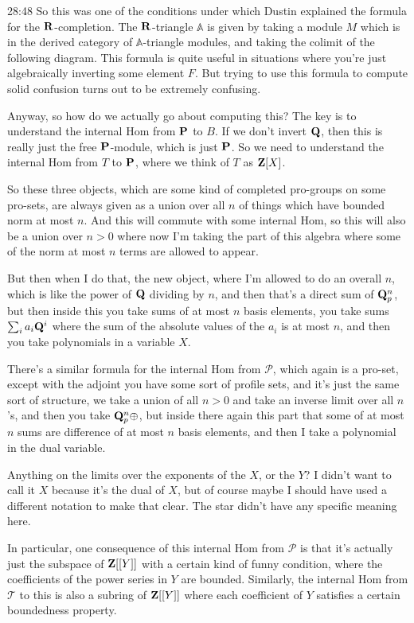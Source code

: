 \begin{unfinished}{28:48}
So this was one of the conditions under which Dustin explained the formula for the $\R$-completion. The $\R$-triangle $\mathbb{A}$ is given by taking a module $M$ which is in the derived category of $\mathbb{A}$-triangle modules, and taking the colimit of the following diagram. This formula is quite useful in situations where you're just algebraically inverting some element $F$. But trying to use this formula to compute solid confusion turns out to be extremely confusing.

Anyway, so how do we actually go about computing this? The key is to understand the internal Hom from $\P$ to $B$. If we don't invert $\Q$, then this is really just the free $\P$-module, which is just $\P$. So we need to understand the internal Hom from $T$ to $\P$, where we think of $T$ as $\Z[X]$.

So these three objects, which are some kind of completed pro-groups on some pro-sets, are always given as a union over all $n$ of things which have bounded norm at most $n$. And this will commute with some internal Hom, so this will also be a union over $n > 0$ where now I'm taking the part of this algebra where some of the norm at most $n$ terms are allowed to appear. 

But then when I do that, the new object, where I'm allowed to do an overall $n$, which is like the power of $\Q$ dividing by $n$, and then that's a direct sum of $\Q_p^n$, but then inside this you take sums of at most $n$ basis elements, you take sums $\sum_{i} a_i \Q^i$ where the sum of the absolute values of the $a_i$ is at most $n$, and then you take polynomials in a variable $X$.

There's a similar formula for the internal Hom from $\mathcal{P}$, which again is a pro-set, except with the adjoint you have some sort of profile sets, and it's just the same sort of structure, we take a union of all $n > 0$ and take an inverse limit over all $n$'s, and then you take $\Q_p^n \oplus$, but inside there again this part that some of at most $n$ sums are difference of at most $n$ basis elements, and then I take a polynomial in the dual variable.

Anything on the limits over the exponents of the $X$, or the $Y$? I didn't want to call it $X$ because it's the dual of $X$, but of course maybe I should have used a different notation to make that clear. The star didn't have any specific meaning here.

In particular, one consequence of this internal Hom from $\mathcal{P}$ is that it's actually just the subspace of $\Z[[Y]]$ with a certain kind of funny condition, where the coefficients of the power series in $Y$ are bounded. Similarly, the internal Hom from $\mathcal{T}$ to this is also a subring of $\Z[[Y]]$ where each coefficient of $Y$ satisfies a certain boundedness property.


\end{unfinished}
